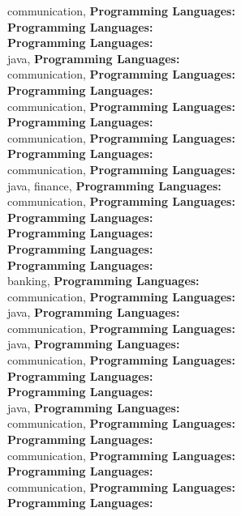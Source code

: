 communication, \textbf{Programming Languages:} \\
\textbf{Programming Languages:} \\
\textbf{Programming Languages:} \\
java, \textbf{Programming Languages:} \\
communication, \textbf{Programming Languages:} \\
\textbf{Programming Languages:} \\
communication, \textbf{Programming Languages:} \\
\textbf{Programming Languages:} \\
communication, \textbf{Programming Languages:} \\
\textbf{Programming Languages:} \\
communication, \textbf{Programming Languages:} \\
java, finance, \textbf{Programming Languages:} \\
communication, \textbf{Programming Languages:} \\
\textbf{Programming Languages:} \\
\textbf{Programming Languages:} \\
\textbf{Programming Languages:} \\
\textbf{Programming Languages:} \\
banking, \textbf{Programming Languages:} \\
communication, \textbf{Programming Languages:} \\
java, \textbf{Programming Languages:} \\
communication, \textbf{Programming Languages:} \\
java, \textbf{Programming Languages:} \\
communication, \textbf{Programming Languages:} \\
\textbf{Programming Languages:} \\
\textbf{Programming Languages:} \\
java, \textbf{Programming Languages:} \\
communication, \textbf{Programming Languages:} \\
\textbf{Programming Languages:} \\
communication, \textbf{Programming Languages:} \\
\textbf{Programming Languages:} \\
communication, \textbf{Programming Languages:} \\
\textbf{Programming Languages:} \\
